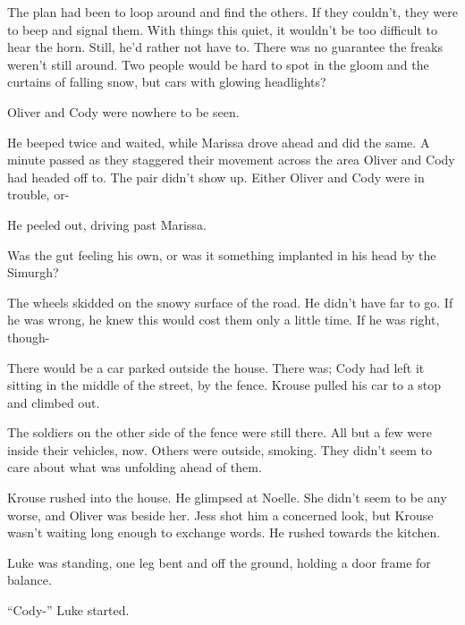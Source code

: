 The plan had been to loop around and find the others.  If they couldn't, they were to beep and signal them.  With things this quiet, it wouldn't be too difficult to hear the horn.  Still, he'd rather not have to.  There was no guarantee the freaks weren't still around.  Two people would be hard to spot in the gloom and the curtains of falling snow, but cars with glowing headlights?



Oliver and Cody were nowhere to be seen.



He beeped twice and waited, while Marissa drove ahead and did the same.  A minute passed as they staggered their movement across the area Oliver and Cody had headed off to.  The pair didn't show up.  Either Oliver and Cody were in trouble, or-



He peeled out, driving past Marissa.



Was the gut feeling his own, or was it something implanted in his head by the Simurgh?



The wheels skidded on the snowy surface of the road.  He didn't have far to go.  If he was wrong, he knew this would cost them only a little time.  If he was right, though-



There would be a car parked outside the house.  There was; Cody had left it sitting in the middle of the street, by the fence.  Krouse pulled his car to a stop and climbed out.



The soldiers on the other side of the fence were still there.  All but a few were inside their vehicles, now.  Others were outside, smoking.  They didn't seem to care about what was unfolding ahead of them.



Krouse rushed into the house.  He glimpsed at Noelle.  She didn't seem to be any worse, and Oliver was beside her.  Jess shot him a concerned look, but Krouse wasn't waiting long enough to exchange words.  He rushed towards the kitchen.



Luke was standing, one leg bent and off the ground, holding a door frame for balance.



``Cody-'' Luke started.



